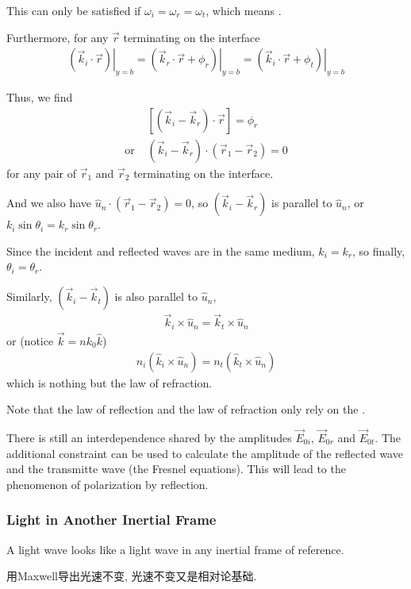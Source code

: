 This can only be satisfied if $\omega_i=\omega_r=\omega_t$, which means . 

Furthermore, for any $\vec{r}$ terminating on the interface
\begin{align*}
    \left. \left( \vec{k}_i \cdot \vec{r} \right)\right|_{y=b} = \left. \left( \vec{k}_r \cdot \vec{r} +\phi_r \right)\right|_{y=b} = \left. \left( \vec{k}_i \cdot \vec{r} +\phi_t \right)\right|_{y=b}
\end{align*}

Thus, we find
\begin{align*}
    &\left[ (\vec{k}_i-\vec{k}_r)\cdot \vec{r} \right]=\phi_r\\
    \text{or }&(\vec{k}_i-\vec{k}_r)\cdot(\vec{r}_1-\vec{r}_2)=0
\end{align*}
for any pair of $\vec{r}_1$ and $\vec{r}_2$ terminating on the interface. 

And we also have $\hat{u}_n\cdot(\vec{r}_1-\vec{r}_2)=0$, so $(\vec{k}_i-\vec{k}_r)$ is parallel to $\hat{u}_n$, or $k_i\sin\theta_i=k_r\sin\theta_r$. 

Since the incident and reflected waves are in the same medium, $k_i=k_r$, so finally, $\theta_i=\theta_r$. 

Similarly, $(\vec{k}_i-\vec{k}_t)$ is also parallel to $\hat{u}_n$, 
\begin{align*}
    \vec{k}_i\times \hat{u}_n=\vec{k}_t\times \hat{u}_n
\end{align*}
or (notice $\vec{k}=nk_0\hat{k}$)
\begin{align*}
    n_i\left( \hat{k}_i\times \hat{u}_n \right)=n_t\left( \hat{k}_t\times \hat{u}_n \right)
\end{align*}
which is nothing but the law of refraction. 

Note that the law of reflection and the law of refraction only rely on the . 

There is still an interdependence shared by the amplitudes $\vec{E}_{0i}$, $\vec{E}_{0r}$ and $\vec{E}_{0t}$. The additional constraint can be used to calculate the amplitude of the reflected wave and the transmitte wave (the Fresnel equations). This will lead to the phenomenon of polarization by reflection. 

\subsubsection{Light in Another Inertial Frame}
A light wave looks like a light wave in any inertial frame of reference.

用Maxwell导出光速不变, 光速不变又是相对论基础. 